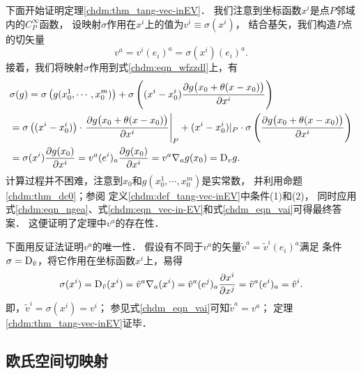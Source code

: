 下面开始证明定理\ref{chdm:thm_tang-vec-inEV}．
我们注意到坐标函数$x^i$是点$P$邻域内的$C^\infty_P$函数，
设映射$\sigma$作用在$x^i$上的值为$v^i\equiv\sigma(x^i)$，
结合基矢，我们构造$P$点的切矢量
\begin{equation}\label{chdm_eqn_vai}
    v^a = v^i (e_i)^a =\sigma(x^i)(e_i)^a.
\end{equation}
接着，我们将映射$\sigma$作用到式\eqref{chdm:eqn_wfzzdl}上，有
\begin{align*}
    &\sigma(g) = \sigma\left(g(x^1_0,\cdots,x^m_0)\right)+
    \sigma\left((x^i-x^i_0) \frac{\partial g\bigl(x_0+\theta(x-x_0) \bigr)}{\partial x^i}\right) \\
    &= \sigma\left((x^i-x^i_0) \right) \cdot 
       \left.\frac{\partial g\bigl(x_0+\theta(x-x_0) \bigr)}{\partial x^i}\right|_{P}
    +  (x^i-x^i_0)|_P \cdot \sigma\left(\frac{\partial g\bigl(x_0+\theta(x-x_0) \bigr)}{\partial x^i}\right) \\
    &= \sigma(x^i) \frac{\partial g(x_0)}{\partial x^i}
    =v^a (e^i)_a \frac{\partial g(x_0)}{\partial x^i}
    =v^a \nabla_a g(x_0) = {\rm D}_v g.
\end{align*}  %
计算过程并不困难，注意到$x_0$和$g(x^1_0,\cdots,x^m_0)$是实常数，
并利用命题\ref{chdm:thm_dc0}；参阅
定义\ref{chdm:def_tang-vec-inEV}中条件(1)和(2)，
同时应用式\eqref{chdm:eqn_ngea}、式\eqref{chdm:eqn_vec-in-EV}和式\eqref{chdm_eqn_vai}可得最终答案．
这便证明了定理中$v^a$的存在性．

下面用反证法证明$v^a$的唯一性．
假设有不同于$v^a$的矢量$\tilde{v}^a = \tilde{v}^i (e_i)^a$满足
条件$\sigma={\rm D}_{\tilde{v}}$，将它作用在坐标函数$x^i$上，易得
\begin{equation}
    \sigma(x^i)={\rm D}_{\tilde{v}}(x^i) =\tilde{v}^a \nabla_a (x^i)
    =\tilde{v}^a (e^j)_a \frac{\partial x^i}{\partial x^j}
    =\tilde{v}^a (e^i)_a = \tilde{v}^i .
\end{equation}
即，$\tilde{v}^i = \sigma(x^i) = v^i$；
参见式\eqref{chdm_eqn_vai}可知$\tilde{v}^a = v^a$；
定理\ref{chdm:thm_tang-vec-inEV}证毕．

\subsection{欧氏空间切映射}

